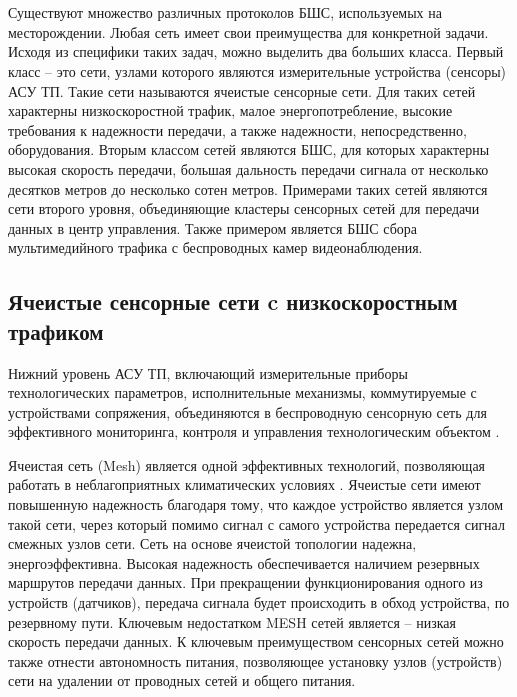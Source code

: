 \section{}

Существуют множество различных протоколов БШС, используемых на месторождении. Любая сеть имеет свои преимущества для конкретной задачи. Исходя из специфики таких задач, можно выделить два больших класса. Первый класс -- это сети, узлами которого являются измерительные устройства (сенсоры) АСУ ТП. Такие сети называются  ячеистые сенсорные сети. Для таких сетей характерны низкоскоростной трафик, малое энергопотребление, высокие требования к надежности передачи, а также надежности, непосредственно,  оборудования. Вторым классом сетей являются БШС, для которых  характерны высокая скорость передачи, большая дальность передачи сигнала от несколько десятков метров до несколько сотен метров. Примерами таких сетей являются сети второго уровня, объединяющие кластеры сенсорных сетей для передачи данных в центр управления. Также примером является БШС сбора мультимедийного трафика с беспроводных камер видеонаблюдения. 

\subsection{Ячеистые сенсорные сети c низкоскоростным трафиком}
Нижний уровень АСУ ТП, включающий измерительные приборы технологических параметров, исполнительные механизмы, коммутируемые с устройствами сопряжения, объединяются в беспроводную сенсорную сеть для эффективного мониторинга, контроля и управления технологическим объектом \cite{Florencio2020}.


Ячеистая сеть (Mesh) является одной эффективных технологий, позволяющая работать в неблагоприятных климатических условиях \cite{Sidney2015} . Ячеистые сети имеют повышенную надежность благодаря тому, что каждое устройство является узлом такой сети, через который помимо сигнал с самого устройства передается сигнал смежных узлов сети.
Сеть на основе ячеистой топологии надежна, энергоэффективна. Высокая надежность обеспечивается наличием резервных маршрутов передачи данных. При прекращении функционирования одного из устройств (датчиков), передача сигнала будет происходить в обход устройства, по резервному пути. Ключевым недостатком MESH сетей является -- низкая скорость передачи данных. К ключевым преимуществом сенсорных сетей можно также отнести автономность питания, позволяющее установку узлов (устройств) сети на удалении от проводных сетей и общего питания. 


